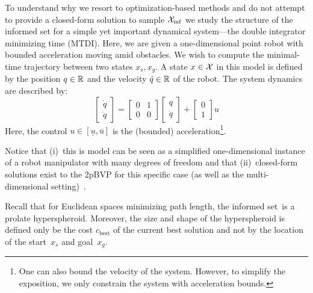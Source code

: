 \documentclass[letterpaper, 10 pt, conference]{ieeeconf}  %
\begin{document}
To understand why we resort to optimization-based methods and do not attempt to provide a closed-form solution to sample $\mathcal{X}_{\rm {inf}}$ we study the structure of the informed set for a simple yet important dynamical system---the double integrator minimizing time (MTDI). 
Here, we are given a one-dimensional point robot with bounded acceleration moving amid obstacles. We wish to compute the minimal-time trajectory between two states $x_s, x_g$.
A state $x \in \mathcal{X}$ in this model is defined by 
the position $q \in \mathbb{R}$
and
the velocity $\dot{q}\in \mathbb{R}$ of the robot.
The system dynamics are described by:
\begin{equation}
\begin{bmatrix}
	\dot{q} \\
	\ddot{q}
\end{bmatrix}
=
\begin{bmatrix}
	0 & 1 \\
	0 & 0
\end{bmatrix}
\begin{bmatrix}
	{q} \\
	\dot{q}
\end{bmatrix}
+
\begin{bmatrix}
	0 \\
	1
\end{bmatrix}
u
\end{equation}
Here, the control 
$u \in [\underline{u}, \overline{u}]$ 
is the (bounded) acceleration\footnote{One can also bound the velocity of the system. However, to simplify the exposition, we only constrain the system with acceleration bounds.}. 


Notice that 
(i)~this is model can be seen as a simplified one-dimensional instance of a robot manipulator with many degrees of freedom and that
(ii)~closed-form solutions exist to the 2pBVP for this specific case (as well as the multi-dimensional setting)~\cite{HN10, KS14}.

%
%
Recall that for Euclidean spaces minimizing path length, the informed set~\Cinf is a prolate hyperspheroid.
Moreover, the size and shape of the hyperspheroid is defined only be the cost $c_{\text{best}}$ of the current best solution and not by the location of the start~$x_s$ and goal~$x_g$.
\end{document}

